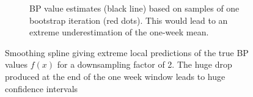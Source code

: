 \begin{figure}[!ht]
\begin{subfigure}{.42\textwidth}
  \caption[Estimate Single Bootstrap Sample]{
      BP value estimates (black line) based on samples of one bootstrap iteration (red dots). This would
  lead to an extreme underestimation of the one-week mean.}
    \label{subfig: ex-spline-failure-bootstrap}
\end{subfigure}
\caption[Smoothing Spline Failure]{
    Smoothing spline giving extreme local predictions of the true BP values $f(x)$
    for a downsampling factor of 2.
    The huge drop produced at the end of the one week window
    leads to huge confidence intervals}
\label{fig:ex-spline-failure}
\end{figure}






%
%
%
%
%













